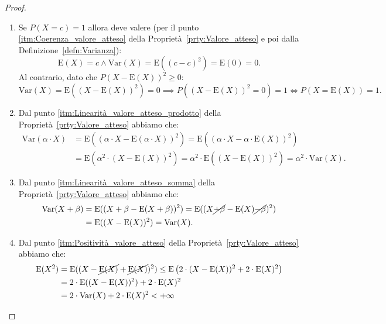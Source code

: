         \begin{proof}
            \hfill
            \begin{enumerate}
                \item Se $P(X = c) = 1$ allora deve valere (per il punto \eqref{itm:Coerenza_valore_atteso} della Proprietà~\ref{prty:Valore_atteso} e poi dalla Definizione~\ref{defn:Varianza}): \[
                    \text{E}(X) = c \land \text{Var}(X) = \text{E}((c-c)^2) = \text{E}(0) = 0
                .\] Al contrario, dato che $P(X -\text{E}(X))^2 \geq 0$: \[
                \text{Var}(X) = \text{E}((X - \text{E}(X))^2) = 0 \implies P((X - \text{E}(X))^2 = 0) = 1 \iff P(X = \text{E}(X)) = 1
                .\]
                \item Dal punto \eqref{itm:Linearità_valore_atteso_prodotto} della Proprietà~\ref{prty:Valore_atteso} abbiamo che:
                \begin{align*}
                        \text{Var}(\alpha \cdot X) &= \text{E}((\alpha \cdot X - \text{E}(\alpha \cdot X))^2) = \text{E}((\alpha \cdot X - \alpha \cdot \text{E}(X))^2) \\
                                          &= \text{E}(\alpha^2 \cdot (X - \text{E}(X))^2) = \alpha^2 \cdot \text{E}((X - \text{E}(X))^2)= \alpha^2 \cdot \text{Var}(X)
                .\end{align*}
                \item Dal punto \eqref{itm:Linearità_valore_atteso_somma} della Proprietà~\ref{prty:Valore_atteso} abbiamo che:
                \begin{align*}
                    \text{Var}(X + \beta) &= \text{E}((X+\beta -\text{E}(X+\beta))^2) = \text{E}((X \cancel{+\beta} -\text{E}(X) \cancel{-\beta})^2) \\
                                          &= \text{E}((X - \text{E}(X))^2) = \text{Var}(X)
                .\end{align*}
                \item Dal punto \eqref{itm:Positività_valore_atteso} della Proprietà~\ref{prty:Valore_atteso} abbiamo che:
                \begin{align*}
                    \text{E}(X^2) &= \text{E}((X - \cancel{\text{E}(X)} + \cancel{\text{E}(X)})^2) \leq \text{E}\left(2\cdot(X - \text{E}(X))^2 + 2\cdot\text{E}(X)^2\right) \\
                                  &= 2 \cdot \text{E}((X - \text{E}(X))^2) + 2\cdot\text{E}(X)^2 \\
                                  &= 2\cdot\text{Var}(X) + 2\cdot\text{E}(X)^2 < +\infty

\end{align*}
\end{enumerate}
\end{proof}
